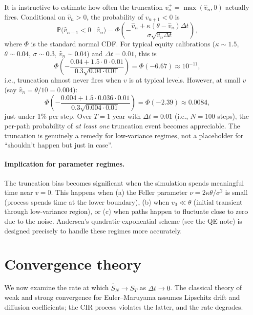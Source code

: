 \documentclass[11pt]{article}
\theoremstyle{plain}
\theoremstyle{definition}
\theoremstyle{remark}
\begin{document}
It is instructive to estimate how often the truncation $v_n^+ = \max(\hat v_n, 0)$ actually fires. Conditional on $\hat v_n > 0$, the probability of $\hat v_{n+1} < 0$ is
\[
    \mathbb{P}\bigl(\hat v_{n+1} < 0 \mid \hat v_n\bigr) = \Phi\!\left(-\frac{\hat v_n + \kappa(\theta - \hat v_n)\Delta t}{\sigma\sqrt{\hat v_n \Delta t}}\right),
\]
where $\Phi$ is the standard normal CDF. For typical equity calibrations ($\kappa \sim 1.5$, $\theta \sim 0.04$, $\sigma \sim 0.3$, $\hat v_n \sim 0.04$) and $\Delta t = 0.01$, this is
\[
    \Phi\!\left(-\frac{0.04 + 1.5 \cdot 0 \cdot 0.01}{0.3\sqrt{0.04 \cdot 0.01}}\right) = \Phi(-6.67) \approx 10^{-11},
\]
i.e., truncation almost never fires when $v$ is at typical levels. However, at small $v$ (say $\hat v_n = \theta/10 = 0.004$):
\[
    \Phi\!\left(-\frac{0.004 + 1.5 \cdot 0.036 \cdot 0.01}{0.3\sqrt{0.004 \cdot 0.01}}\right) = \Phi(-2.39) \approx 0.0084,
\]
just under 1\% per step. Over $T = 1$ year with $\Delta t = 0.01$ (i.e., $N = 100$ steps), the per-path probability of \emph{at least one} truncation event becomes appreciable. The truncation is genuinely a remedy for low-variance regimes, not a placeholder for ``shouldn't happen but just in case''.

\paragraph{Implication for parameter regimes.} The truncation bias becomes significant when the simulation spends meaningful time near $v = 0$. This happens when (a) the Feller parameter $\nu = 2\kappa\theta/\sigma^2$ is small (process spends time at the lower boundary), (b) when $v_0 \ll \theta$ (initial transient through low-variance region), or (c) when paths happen to fluctuate close to zero due to the noise. Andersen's quadratic-exponential scheme (see the QE note) is designed precisely to handle these regimes more accurately.

\section{Convergence theory}

We now examine the rate at which $\hat S_N \to S_T$ as $\Delta t \to 0$. The classical theory of weak and strong convergence for Euler--Maruyama assumes Lipschitz drift and diffusion coefficients; the CIR process violates the latter, and the rate degrades.
\end{document}
